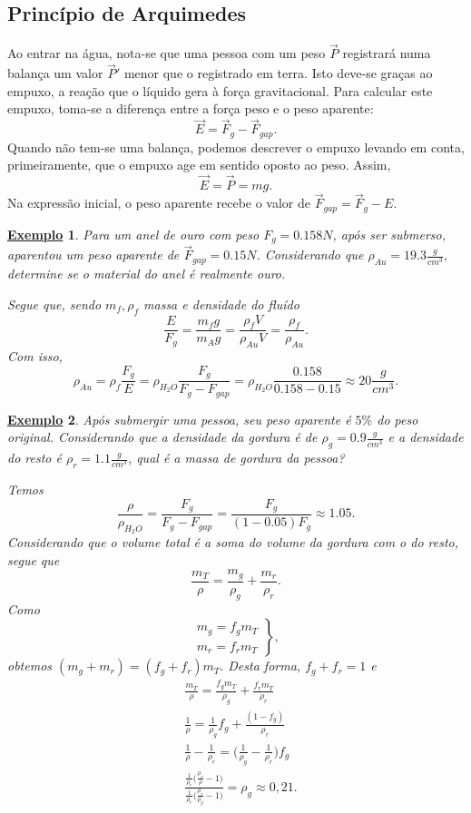 \documentclass{article}
\newtheorem{example}{\underline{Exemplo}}
\begin{document}
\subsection{Princípio de Arquimedes}
Ao entrar na água, nota-se que uma pessoa com um peso \(\vec{P}\) registrará numa balança um valor \(\vec{P}'\) menor que o registrado em terra. Isto deve-se graças ao empuxo,
a reação que o líquido gera à força gravitacional. Para calcular este empuxo, toma-se a diferença entre a força peso e o peso aparente: 
\[
  \vec{E} = \vec{F}_{g}-\vec{F}_{gap}.
\]
Quando não tem-se uma balança, podemos descrever o empuxo levando em conta, primeiramente, que o empuxo age em sentido oposto ao peso. Assim, 
\[
  \vec{E} = \vec{P} = mg.
\]
Na expressão inicial, o peso aparente recebe o valor de \(\vec{F}_{gap}=\vec{F}_{g} - E\).
\begin{example}
  Para um anel de ouro com peso \(F_{g} = 0.158N\), após ser submerso, aparentou um peso aparente de \(\vec{F}_{gap}=0.15N\). Considerando que
  \(\rho_{Au} = 19.3\frac{g}{cm^{3}},\) determine se o material do anel é realmente ouro.

  Segue que, sendo \(m_{f}, \rho_{f}\) massa e densidade do fluído
  \[
    \frac{E}{F_{g}} = \frac{m_{f}g}{m_{A}g} = \frac{\rho_{f}V}{\rho_{Au}V} = \frac{\rho_{f}}{\rho_{Au}}.
  \]
  Com isso, 
  \[
    \rho_{Au} = \rho_{f}\frac{F_{g}}{E} = \rho_{H_{2}O}\frac{F_{g}}{F_{g}-F_{gap}}=\rho_{H_{2}O}\frac{0.158}{0.158-0.15}\approx 20\frac{g}{cm^{3}}.
  \]
\end{example}
\begin{example}
  Após submergir uma pessoa, seu peso aparente é \(5\%\) do peso original. Considerando que a densidade da gordura é de
  \(\rho_{g} = 0.9 \frac{g}{cm^{3}}\) e a densidade do resto é \(\rho_{r} = 1.1 \frac{g}{cm^{3}}\), qual é a massa de gordura da pessoa?

  Temos 
  \[
    \frac{\rho }{\rho_{H_{2}O}} = \frac{F_{g}}{F_{g}-F_{gap}} = \frac{F_{g}}{(1-0.05)F_{g}}\approx 1.05.
  \]
  Considerando que o volume total é a soma do volume da gordura com o do resto, segue que 
  \[
    \frac{m_{T}}{\rho }= \frac{m_{g}}{\rho_{g}}+\frac{m_{r}}{\rho_{r}}.
  \]
  Como 
  \[
    \left.\begin{array}{ll}
        m_{g} = f_{g}m_{T}\\
        m_{r} = f_{r}m_{T}
    \end{array}\right\},
  \]
  obtemos \((m_{g}+m_{r}) = (f_{g}+f_{r})m_{T}.\) Desta forma, \(f_{g}+f_{r}=1\) e
  \begin{align*}
     &\frac{m_{T}}{\rho } = \frac{f_{g}m_{T}}{\rho_{g}} + \frac{f_{r}m_{T}}{\rho_{r}}\\
     &\frac{1}{\rho }=\frac{1}{\rho_{g}}f_{g} + \frac{(1-f_{g})}{\rho_{r}}\\
     &\frac{1}{\rho }-\frac{1}{\rho_{r}}=\biggl(\frac{1}{\rho_{g}}-\frac{1}{\rho_{r}}\biggr)f_{g}\\
     &\frac{\frac{1}{\rho_{r}}\biggl(\frac{\rho_{r}}{\rho }-1\biggr)}{\frac{1}{\rho_{r}}\biggl(\frac{\rho_{r}}{\rho_{g}}-1\biggr)} = \rho_{g}\approx0,21.
  \end{align*}
\end{example}
\newpage
\end{document}
